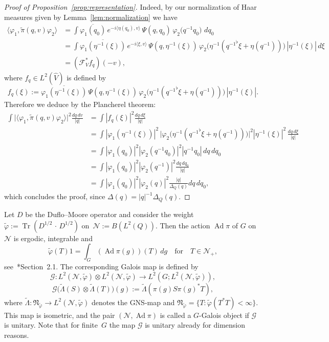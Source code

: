 \documentclass[a4paper,11pt,reqno]{amsart}
\numberwithin{equation}{section}
\theoremstyle{remark}
\theoremstyle{definition}
\newcommand\Ad{\operatorname{Ad}}
\newcommand\Tr{\operatorname{Tr}}
\newcommand{\N}{{\mathcal N}}
\newcommand{\G}{\mathcal{G}}
\newcommand{\vf}{\varphi}
\newcommand{\CF}{\mathcal F}
\begin{document}
\begin{proof}[Proof of Proposition~\ref{prop:representation}]
Indeed, by our normalization of Haar measures given by Lemma~\ref{lem:normalization} we have
\begin{align*}
\langle\vf_1,\tilde\pi(q,v)\vf_2\rangle&=\int \overline{\vf_1(q_0)} \,e^{-i \langle\eta(q_0),v\rangle}\,\Psi(q,q_0)\,\vf_2\big(q^{-1}q_0\big)\,
\,dq_0\\
&=\int \overline{\vf_1(\eta^{-1}(\xi))} \,e^{-i \langle\xi,v\rangle}\,\Psi(q,\eta^{-1}(\xi))\,\vf_2\big(\eta^{-1}({q^{-1}}^\flat\xi+\eta(q^{-1}))\big)\,
|\eta^{-1}(\xi)|\,d\xi\\
&=(\CF_V^* f_q)(-v),
\end{align*}
where $f_q\in L^2(\hat V)$ is defined by
$$
f_q(\xi):=\overline{\vf_1(\eta^{-1}(\xi))} \,\Psi(q,\eta^{-1}(\xi))\,\vf_2\big(\eta^{-1}({q^{-1}}^\flat\xi+\eta(q^{-1}))\big)\,
|\eta^{-1}(\xi)|.
$$
Therefore we deduce by the Plancherel theorem:
\begin{align*}
\int \big|\langle\vf_1,\tilde\pi(q,v)\vf_2\rangle\big|^2 \frac{dq\,dv}{|q|}&=\int |f_q(\xi)|^2  \frac{dq\,d\xi}{|q|}\\
&=\int |\vf_1(\eta^{-1}(\xi))|^2 \,\big|\vf_2\big(\eta^{-1}({q^{-1}}^\flat\xi+\eta(q^{-1}))\big)\big|^2|\eta^{-1}(\xi)|^2\, \frac{dq\,d\xi}{|q|}\\
&=\int |\vf_1(q_0)|^2|\vf_2(q^{-1}q_0)|^2|q^{-1}q_0|\, dq\,dq_0\\
&=\int |\vf_1(q_0)|^2|\vf_2(q^{-1})|^2\frac{dq\,dq_0}{|q|}\\
&=\int |\vf_1(q_0)|^2|\vf_2(q)|^2\frac{|q|}{\Delta_Q(q)}dq\,dq_0,
\end{align*}
which concludes the proof, since $\Delta(q)=|q|^{-1}\Delta_Q(q)$.
\end{proof}

Let $D$ be the Duflo--Moore operator and consider the weight $\tilde\varphi:=\Tr(D^{1/2}\,\cdot\, D^{1/2})$ on~$\N:=B(L^2(Q))$. Then the action $\Ad\pi$ of $G$ on $\N$ is ergodic, integrable and
$$
\tilde\varphi(T)1=\int_G(\Ad\pi(g))(T)\,dg\quad\text{for}\quad T\in \N_+,
$$
see~\cite{BGNT3}*{Section~2.1}. The corresponding Galois map is defined by
$$
{\mathcal G}\colon L^2(\N,\tilde\varphi)\otimes L^2(\N,\tilde\varphi)\to L^2(G;L^2(\N,\tilde\varphi)),
$$
$$
{\mathcal G}\big(\tilde\Lambda(S)\otimes \tilde\Lambda(T)\big)(g):=\tilde\Lambda(\pi(g)S\pi(g)^*T),
$$
where $\tilde\Lambda\colon{\mathfrak N}_{\tilde\varphi}\to L^2(\N,\tilde\varphi)$ denotes the GNS-map and ${\mathfrak N}_{\tilde\varphi}=\{T:\tilde\varphi(T^*T)<\infty\}$. This map is isometric, and the pair $(\N,\Ad\pi)$ is called a $G$-Galois object if $\mathcal G$ is unitary. Note that for finite~$G$ the map $\G$ is unitary already for dimension reasons.
\end{document}
